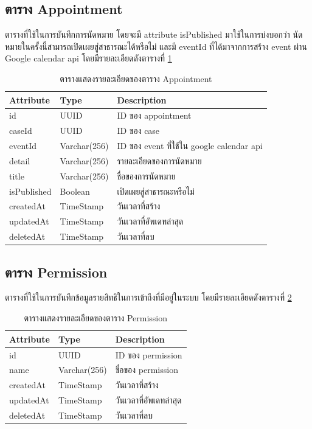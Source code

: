 \documentclass[12pt,oneside,openright,a4paper]{cpe-thai-project}
\begin{document}
\subsection{ตาราง Appointment}
ตารางที่ใช้ในการบันทึกการนัดหมาย โดยจะมี attribute isPublished มาใช้ในการบ่งบอกว่า นัดหมายในครั้งนี้สามารถเปิดเผยสู่สาธารณะได้หรือไม่ และมี eventId ที่ได้มาจากการสร้าง event ผ่าน Google calendar api โดยมีรายละเอียดดังตารางที่  \ref{tbl:dbAppointment}
\begin{table}[!h]
    \centering
    \begin{tabular}{|l|l|l|}
    \hline
    \textbf{Attribute} & \textbf{Type} & \textbf{Description}   \\ \hline
    id          & UUID        & ID ของ appointment                        \\ \hline
    caseId      & UUID        & ID ของ case                               \\ \hline
    eventId     & Varchar(256) & ID ของ event ที่ใช้ใน google calendar api \\ \hline
    detail      & Varchar(256) & รายละเอียดของการนัดหมาย                   \\ \hline
    title       & Varchar(256) & ชื่อของการนัดหมาย                         \\ \hline
    isPublished & Boolean        & เปิดเผยสู่สาธารณะหรือไม่                  \\ \hline
    createdAt   & TimeStamp   & วันเวลาที่สร้าง                           \\ \hline
    updatedAt   & TimeStamp   & วันเวลาที่อัพเดทล่าสุด                    \\ \hline
    deletedAt   & TimeStamp   & วันเวลาที่ลบ             \\ \hline
    \end{tabular}
    \caption{\centering  ตารางแสดงรายละเอียดของตาราง Appointment} \label{tbl:dbAppointment}
\end{table}


\subsection{ตาราง Permission}
ตารางที่ใช้ในการบันทึกข้อมูลรายสิทธิในการเข้าถึงที่มีอยู่ในระบบ โดยมีรายละเอียดดังตารางที่ \ref{tbl:dbPermission}
\begin{table}[!h]
    \centering
    \begin{tabular}{|l|l|l|}
    \hline
    \textbf{Attribute} & \textbf{Type} & \textbf{Description}   \\ \hline
    id        & UUID        & ID ของ permission      \\ \hline
    name      & Varchar(256) & ชื่อของ permission     \\ \hline
    createdAt & TimeStamp   & วันเวลาที่สร้าง        \\ \hline
    updatedAt & TimeStamp   & วันเวลาที่อัพเดทล่าสุด \\ \hline
    deletedAt & TimeStamp   & วันเวลาที่ลบ                \\ \hline
    \end{tabular}
    \caption{\centering  ตารางแสดงรายละเอียดของตาราง Permission} \label{tbl:dbPermission}
\end{table}
\end{document}
